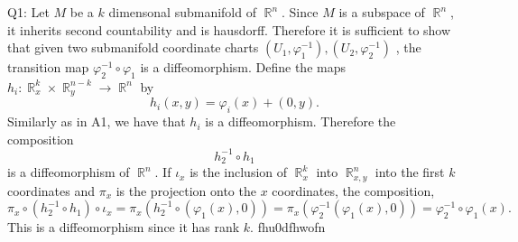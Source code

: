\documentclass[letterpaper]{article}
\DeclareMathOperator{\R}{\mathbb{R}}
\begin{document}
 
\noindent Q1:
Let $M$ be a $k$ dimensonal submanifold of $\R^n$. Since $M$ is a subspace of $\R^n$, it inherits second countability and is hausdorff. 
Therefore it is sufficient to show that given two submanifold coordinate charts $(U_1, \varphi_1^{-1}), (U_2, \varphi_2^{-1})$ , the transition map $\varphi_2^{-1} \circ \varphi_1$ is a diffeomorphism. 
Define the maps $h_i: \R_x^k \times \R_y^{n-k} \to \R^n$ by $$h_i(x,y)  = \varphi_i(x) + (0,y).$$ Similarly as in A1, we have that $h_i$ is a diffeomorphism. Therefore the composition $$h_2^{-1} \circ h_1$$ is a diffeomorphism of $\R^n$. 
If $\iota_x$ is the inclusion of $\R_x^k$ into $\R_{x,y}^n$ into the first $k$ coordinates and $\pi_x$ is the projection onto the $x$ coordinates, the composition, 
$$ \pi_x \circ (h_2^{-1} \circ h_1) \circ  \iota_x  = \pi_x(h_2^{-1}\circ (\varphi_1(x), 0))= \pi_x(\varphi_2^{-1}(\varphi_1(x), 0)) = \varphi_2^{-1}\circ \varphi_1(x).$$
This is a diffeomorphism since it has rank $k$. fhu0dfhwofn
\end{document}
